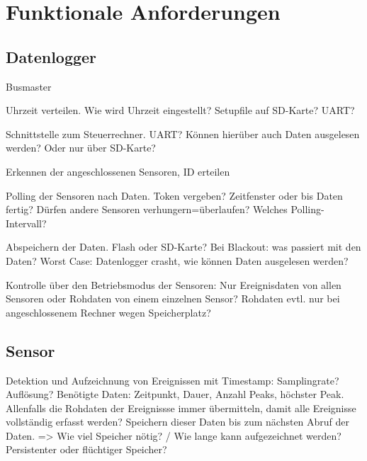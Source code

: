 %
%

\thispagestyle{empty}
\chapter*{Funktionale Anforderungen}\label{chap.funktionale}
\section{Datenlogger}
Busmaster

Uhrzeit verteilen. Wie wird Uhrzeit eingestellt? Setupfile auf SD-Karte? UART?

Schnittstelle zum Steuerrechner. UART? Können hierüber auch Daten ausgelesen werden? Oder nur über SD-Karte?

Erkennen der angeschlossenen Sensoren, ID erteilen

Polling der Sensoren nach Daten. Token vergeben? Zeitfenster oder bis Daten fertig? Dürfen andere Sensoren verhungern=überlaufen? Welches Polling-Intervall?

Abspeichern der Daten. Flash oder SD-Karte? Bei Blackout: was passiert mit den Daten? Worst Case: Datenlogger crasht, wie können Daten ausgelesen werden?

Kontrolle über den Betriebsmodus der Sensoren: Nur Ereignisdaten von allen Sensoren oder Rohdaten von einem einzelnen Sensor? Rohdaten evtl. nur bei angeschlossenem Rechner wegen Speicherplatz?

\section{Sensor}
Detektion und Aufzeichnung von Ereignissen mit Timestamp: Samplingrate? Auflösung? Benötigte Daten: Zeitpunkt, Dauer, Anzahl Peaks, höchster Peak. Allenfalls die Rohdaten der Ereignissse immer übermitteln, damit alle Ereignisse vollständig erfasst werden? Speichern dieser Daten bis zum nächsten Abruf der Daten. => Wie viel Speicher nötig? / Wie lange kann aufgezeichnet werden? Persistenter oder flüchtiger Speicher?

